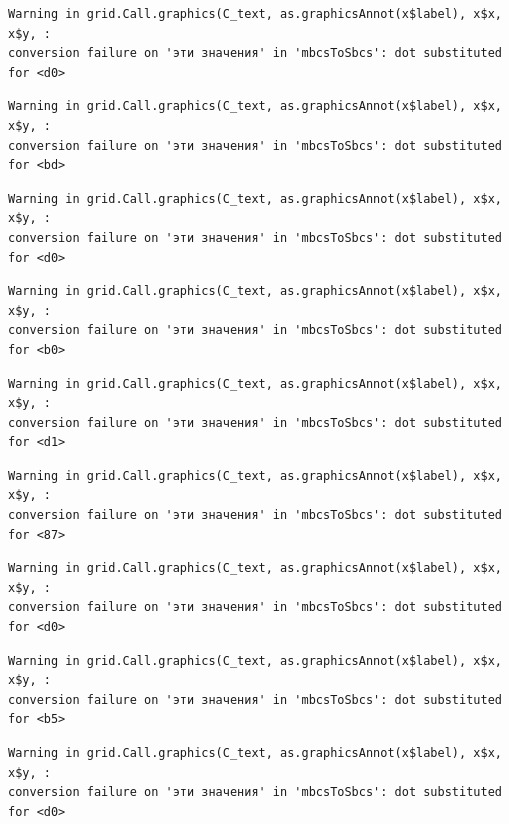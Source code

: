 \documentclass[
  letterpaper,
]{scrbook}
\theoremstyle{definition}
\theoremstyle{remark}
\begin{document}
\begin{verbatim}
Warning in grid.Call.graphics(C_text, as.graphicsAnnot(x$label), x$x, x$y, :
conversion failure on 'эти значения' in 'mbcsToSbcs': dot substituted for <d0>
\end{verbatim}

\begin{verbatim}
Warning in grid.Call.graphics(C_text, as.graphicsAnnot(x$label), x$x, x$y, :
conversion failure on 'эти значения' in 'mbcsToSbcs': dot substituted for <bd>
\end{verbatim}

\begin{verbatim}
Warning in grid.Call.graphics(C_text, as.graphicsAnnot(x$label), x$x, x$y, :
conversion failure on 'эти значения' in 'mbcsToSbcs': dot substituted for <d0>
\end{verbatim}

\begin{verbatim}
Warning in grid.Call.graphics(C_text, as.graphicsAnnot(x$label), x$x, x$y, :
conversion failure on 'эти значения' in 'mbcsToSbcs': dot substituted for <b0>
\end{verbatim}

\begin{verbatim}
Warning in grid.Call.graphics(C_text, as.graphicsAnnot(x$label), x$x, x$y, :
conversion failure on 'эти значения' in 'mbcsToSbcs': dot substituted for <d1>
\end{verbatim}

\begin{verbatim}
Warning in grid.Call.graphics(C_text, as.graphicsAnnot(x$label), x$x, x$y, :
conversion failure on 'эти значения' in 'mbcsToSbcs': dot substituted for <87>
\end{verbatim}

\begin{verbatim}
Warning in grid.Call.graphics(C_text, as.graphicsAnnot(x$label), x$x, x$y, :
conversion failure on 'эти значения' in 'mbcsToSbcs': dot substituted for <d0>
\end{verbatim}

\begin{verbatim}
Warning in grid.Call.graphics(C_text, as.graphicsAnnot(x$label), x$x, x$y, :
conversion failure on 'эти значения' in 'mbcsToSbcs': dot substituted for <b5>
\end{verbatim}

\begin{verbatim}
Warning in grid.Call.graphics(C_text, as.graphicsAnnot(x$label), x$x, x$y, :
conversion failure on 'эти значения' in 'mbcsToSbcs': dot substituted for <d0>
\end{verbatim}
\end{document}
